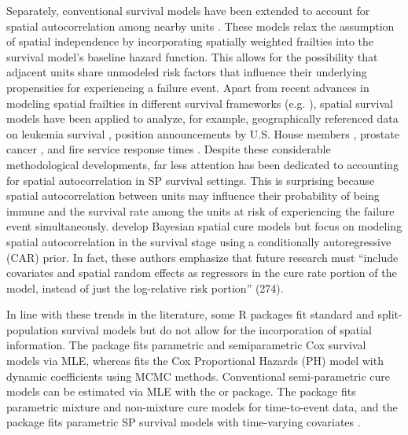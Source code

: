 Separately, conventional survival models have been extended to account for spatial autocorrelation among nearby units \citep{banerjee2003frailty, taylor2017spatsurv,spBayesSurv-article}.
These models relax the assumption of spatial independence by incorporating spatially weighted frailties into the survival model’s baseline hazard function. This allows for the possibility that adjacent units share unmodeled risk factors that influence their underlying propensities for experiencing a failure event. Apart from recent advances in modeling spatial frailties in different survival frameworks (e.g. \citealp{diva2008parametric, spBayesSurv-article}), spatial survival models have been applied to analyze, for example, geographically referenced data on leukemia survival \citep{henderson2002modeling}, position announcements by U.S. House members \citep{darmofal2009bayesian}, prostate cancer
\citep{spBayesSurv-article}, and fire service response times \citep{taylor2017spatsurv}.
Despite these considerable methodological developments, far less attention has been dedicated to accounting for spatial autocorrelation in SP survival settings. This is surprising because  spatial autocorrelation between units may influence their probability of being immune and the survival rate among the units at risk of experiencing the failure event simultaneously. \citet{banerjee2004parametric} develop Bayesian spatial cure models but focus on modeling spatial autocorrelation in the survival stage using a conditionally autoregressive (CAR) prior. In fact, these authors emphasize that future research must “include covariates and spatial random effects as regressors in the cure rate portion of the model, instead of just the log-relative risk portion” (274).

In line with these trends in the literature, some R packages fit standard and split-population survival models but do not allow for the incorporation of spatial information. The  package \citep{survival-package} fits parametric and semiparametric Cox survival models via MLE, whereas  \citep{dynsurv} fits the Cox Proportional Hazards (PH) model with dynamic coefficients using MCMC methods. Conventional semi-parametric cure models can be estimated via MLE with the  \citep{smcure-package} or  \citep{nltm} package. The  \citep{flexsurvcure} package fits parametric mixture and non-mixture cure models for time-to-event data, and the  package fits parametric SP survival models with time-varying covariates \citep{spduration-pkg}.

